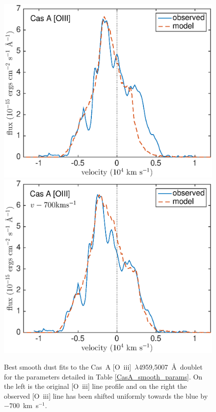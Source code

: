 {\begin{figure}
\centering
\includegraphics[scale=0.43,clip=true, trim=30 0 50 20]{chapters/chapter6/figs/CasA/CasA_OIII}
\includegraphics[scale=0.43,clip=true, trim=30 0 50 20]{chapters/chapter6/figs/CasA/CasA_shifted_OIII}
\caption{Best smooth dust fits to the Cas~A [O~{\sc iii}]~$\lambda$4959,5007~\AA\ doublet for the parameters detailed in Table \ref{CasA_smooth_params}.  On the left is the original [O~{\sc iii}] line profile and on the right the observed [O~{\sc iii}] line has been shifted uniformly towards the blue by $-700$~km~s$^{-1}$.}
\label{CasA_OIII}
\end{figure}
}


